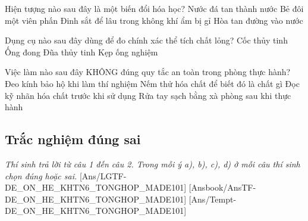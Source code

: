 \documentclass[FileMain.tex]{subfiles}
\begin{document}
\begin{ex}%
Hiện tượng nào sau đây là một biến đổi hóa học?
\choice
{Nước đá tan thành nước}
{Bẻ đôi một viên phấn}
{\True Đinh sắt để lâu trong không khí ẩm bị gỉ}
{Hòa tan đường vào nước}
\end{ex}

\begin{ex}%
Dụng cụ nào sau đây dùng để đo chính xác thể tích chất lỏng?
\choice
{Cốc thủy tinh}
{\True Ống đong}
{Đũa thủy tinh}
{Kẹp ống nghiệm}
\end{ex}

\begin{ex}%
Việc làm nào sau đây KHÔNG đúng quy tắc an toàn trong phòng thực hành?
\choice
{Đeo kính bảo hộ khi làm thí nghiệm}
{\True Nếm thử hóa chất để biết đó là chất gì}
{Đọc kỹ nhãn hóa chất trước khi sử dụng}
{Rửa tay sạch bằng xà phòng sau khi thực hành}
\end{ex}


\subsection{Trắc nghiệm đúng sai}\textit{\large Thí sinh trả lời từ câu 1 đến câu 2. Trong mỗi ý a), b), c), d) ở mỗi câu thí sinh chọn đúng hoặc sai.}
[Ans/LGTF-DE_ON_HE_KHTN6_TONGHOP_MADE101]
[Ansbook/AnsTF-DE_ON_HE_KHTN6_TONGHOP_MADE101]
[Ans/Tempt-DE_ON_HE_KHTN6_TONGHOP_MADE101]
\setcounter{ex}{0}
\end{document}
